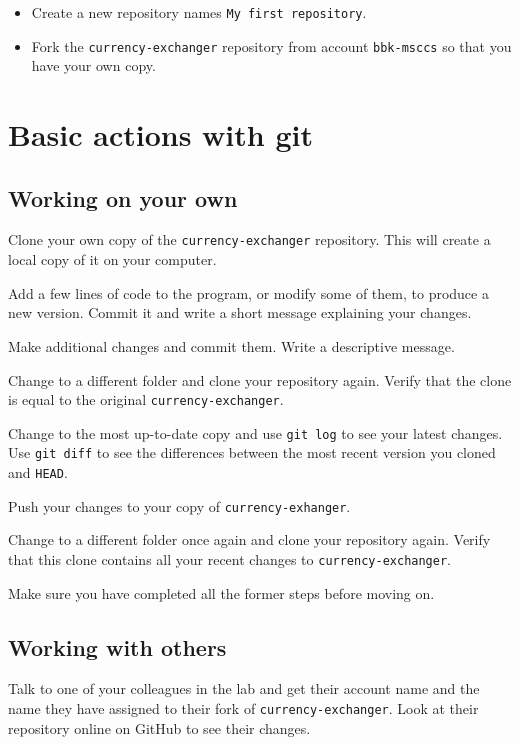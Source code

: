 \documentclass{article}
\begin{document}
\begin{itemize}
\item Create a new repository names \verb+My first repository+.
\item Fork the \verb+currency-exchanger+ repository from account
  \verb+bbk-msccs+ so that you have your own copy.
\end{itemize}

\section{Basic actions with git}
\label{sec:basic-actions-with}

\subsection{Working on your own}
\label{sec:working-your-own}

Clone your own copy of the \verb+currency-exchanger+ repository. This
will create a local copy of it on your computer. 

Add a few lines of code to the program, or modify some of them, to
produce a new version. Commit it and write a short message explaining
your changes. 

Make additional changes and commit them. Write a descriptive message. 

Change to a different folder and clone your repository again. Verify
that the clone is equal to the original \verb+currency-exchanger+. 

Change to the most up-to-date copy and use \verb+git log+ to see your
latest changes. Use \verb+git diff+ to see the differences between the
most recent version you cloned and \verb+HEAD+. 

Push your changes to your copy of \verb+currency-exhanger+.

Change to a different folder once again and clone your repository
again. Verify that this clone contains all your recent changes to
\verb+currency-exchanger+.

Make sure you have completed all the former steps before moving on. 

\subsection{Working with others}
\label{sec:working-with-others}

Talk to one of your colleagues in the lab and get their account name
and the name they have assigned to their fork of
\verb+currency-exchanger+. Look at their repository online on GitHub
to see their changes. 
\end{document}
